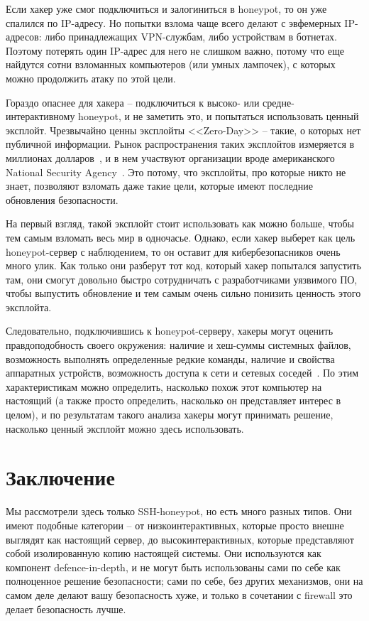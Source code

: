\documentclass[a4page]{article}
\begin{document}
Если хакер уже смог подключиться и залогиниться в honeypot, то он уже спалился по IP-адресу. Но попытки взлома чаще всего делают с эвфемерных IP-адресов: либо принадлежащих VPN-службам, либо устройствам в ботнетах. Поэтому потерять один IP-адрес для него не слишком важно, потому что еще найдутся сотни взломанных компьютеров (или умных лампочек), с которых можно продолжить атаку по этой цели.

Гораздо опаснее для хакера -- подключиться к высоко- или средне-интерактивному honeypot, и не заметить это, и попытаться использовать ценный эксплойт. Чрезвычайно ценны эксплойты <<Zero-Day>> -- такие, о которых нет публичной информации. Рынок распространения таких эксплойтов измеряется в миллионах долларов~\cite{market-zerodays}, и в нем участвуют организации вроде американского National Security Agency~\cite{nsa-zerodays}. Это потому, что эксплойты, про которые никто не знает, позволяют взломать даже такие цели, которые имеют последние обновления безопасности.

На первый взгляд, такой эксплойт стоит использовать как можно больше, чтобы тем самым взломать весь мир в одночасье. Однако, если хакер выберет как цель honeypot-сервер с наблюдением, то он оставит для кибербезопасников очень много улик. Как только они разберут тот код, который хакер попытался запустить там, они смогут довольно быстро сотрудничать с разработчиками уязвимого ПО, чтобы выпустить обновление и тем самым очень сильно понизить ценность этого эксплойта.

Следовательно, подключившись к honeypot-серверу, хакеры могут оценить правдоподобность своего окружения: наличие и хеш-суммы системных файлов, возможность выполнять определенные редкие команды, наличие и свойства аппаратных устройств, возможность доступа к сети и сетевых соседей~\cite{sshlog}. По этим характеристикам можно определить, насколько похож этот компьютер на настоящий (а также просто определить, насколько он представляет интерес в целом), и по результатам такого анализа хакеры могут принимать решение, насколько ценный эксплойт можно здесь использовать.

\section{Заключение}

Мы рассмотрели здесь только SSH-honeypot, но есть много разных типов. Они имеют подобные категории -- от низкоинтерактивных, которые просто внешне выглядят как настоящий сервер, до высокинтерактивных, которые представляют собой изолированную копию настоящей системы. Они используются как компонент defence-in-depth, и не могут быть использованы сами по себе как полноценное решение безопасности; сами по себе, без других механизмов, они на самом деле делают вашу безопасность хуже, и только в сочетании с firewall это делает безопасность лучше.
\end{document}
